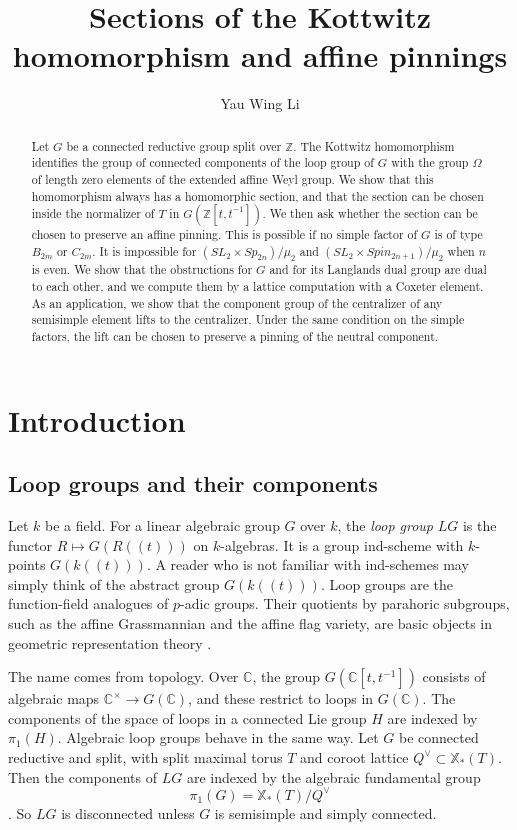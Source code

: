 \documentclass[psamsfonts]{amsart}
\title{Sections of the Kottwitz homomorphism and affine pinnings}
\author{Yau Wing Li}
\theoremstyle{definition}
\theoremstyle{remark}
\numberwithin{equation}{section}
\newcommand{\Z}{\mathbb{Z}}   %
\newcommand{\X}{\mathbb{X}}
\newcommand{\ra}{\rightarrow}
\newcommand{\CC}{\mathbb{C}}
\numberwithin{equation}{section}
\newcommand{\Om}{\Omega}
\theoremstyle{plain}
\begin{document}
\begin{abstract}
Let $G$ be a connected reductive group split over $\Z$. The Kottwitz homomorphism identifies the group of connected components of the loop group of $G$ with the group $\Om$ of length zero elements of the extended affine Weyl group. We show that this homomorphism always has a homomorphic section, and that the section can be chosen inside the normalizer of $T$ in $G(\Z[t,t^{-1}])$. We then ask whether the section can be chosen to preserve an affine pinning. This is possible if no simple factor of $G$ is of type $B_{2m}$ or $C_{2m}$. It is impossible for $(SL_2\times Sp_{2n})/\mu_2$ and $(SL_2\times Spin_{2n+1})/\mu_2$ when $n$ is even. We show that the obstructions for $G$ and for its Langlands dual group are dual to each other, and we compute them by a lattice computation with a Coxeter element. As an application, we show that the component group of the centralizer of any semisimple element lifts to the centralizer. Under the same condition on the simple factors, the lift can be chosen to preserve a pinning of the neutral component.
\end{abstract}

\maketitle

\section{Introduction}\label{sec:intro}

\subsection{Loop groups and their components}
Let $k$ be a field. For a linear algebraic group $G$ over $k$, the \emph{loop group} $LG$ is the functor $R\mapsto G(R(\!(t)\!))$ on $k$-algebras. It is a group ind-scheme with $k$-points $G(k(\!(t)\!))$. A reader who is not familiar with ind-schemes may simply think of the abstract group $G(k(\!(t)\!))$. Loop groups are the function-field analogues of $p$-adic groups. Their quotients by parahoric subgroups, such as the affine Grassmannian and the affine flag variety, are basic objects in geometric representation theory \cite{MV07,Be16,Zhu17}.

The name comes from topology. Over $\CC$, the group $G(\CC[t,t^{-1}])$ consists of algebraic maps $\CC^\times\ra G(\CC)$, and these restrict to loops in $G(\CC)$. The components of the space of loops in a connected Lie group $H$ are indexed by $\pi_1(H)$. Algebraic loop groups behave in the same way. Let $G$ be connected reductive and split, with split maximal torus $T$ and coroot lattice $Q^\vee\subset\X_*(T)$. Then the components of $LG$ are indexed by the algebraic fundamental group
\[
\pi_1(G)=\X_*(T)/Q^\vee
\]
\cite[Theorem~5.1]{PR08}. So $LG$ is disconnected unless $G$ is semisimple and simply connected.
\end{document}
